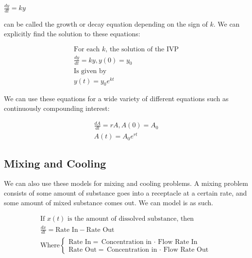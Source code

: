 \documentclass[12pt,landscape,twocolumn]{article}
\begin{document}
    $
    \frac{dy}{dt} = ky
    $

    can be called the growth or decay equation depending on the sign of $k$. We can explicitly find the solution to these equations:

    \begin{equation}\label{eq:growthdecay}
    \begin{aligned}
    \text{For each $k$, the solution of the IVP}\\
    \frac{dy}{dt} = ky, y(0) = y_0\\
    \text{Is given by}\\
    y(t) = y_0 e^{kt}
    \end{aligned}
    \end{equation}

    We can use these equations for a wide variety of different equations such as continuously compounding interest:

    \begin{equation}\label{eq:ccinterest}
    \begin{aligned}
    \frac{dA}{dt} = rA, A(0)=A_0\\
    A(t) = A_0 e^{rt}
    \end{aligned}
    \end{equation}

    \subsection{Mixing and Cooling}

    We can also use these models for mixing and cooling problems. A mixing problem consists of some amount of substance goes into a receptacle at a certain rate, and some amount of mixed substance comes out. We can model is as such.

    \begin{equation}\label{eq:mixcool}
    \begin{aligned}
    \text{If $x(t)$ is the amount of dissolved substance, then}\\
    \frac{dx}{dt} = \text{Rate In} - \text{Rate Out}\\
    \text{Where}
    \begin{cases}
    \text{Rate In} = \text{Concentration in $\cdot$ Flow Rate In}\\
    \text{Rate Out} = \text{Concentration in $\cdot$ Flow Rate Out}
    \end{cases}
    \end{aligned}
    \end{equation}
\end{document}
